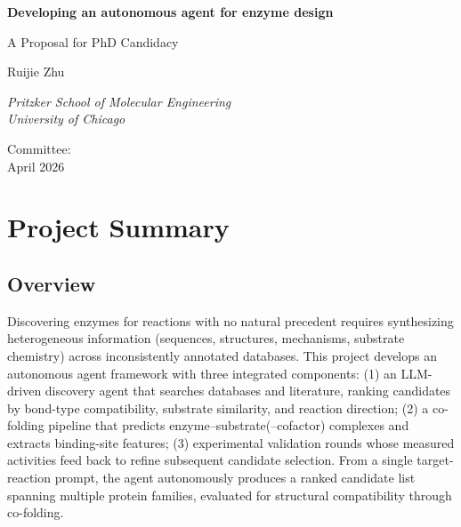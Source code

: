 \documentclass[12pt]{article}
\begin{document}
\begin{titlepage}
    \centering
    \vspace*{1in}

    \huge
    \textbf{Developing an autonomous agent for enzyme design}

    \vspace{0.5in}
    \LARGE
    A Proposal for PhD Candidacy

    \vspace{0.5in}
    \Huge
    Ruijie Zhu

    \Large
    \vspace{0.5in}
    \textit{Pritzker School of Molecular Engineering\\ University of Chicago}

    \vspace{1in}

    \Large
    Committee: \\

    \vfill
    April 2026
\end{titlepage}

\newpage
\setlength{\parindent}{0pt}
\setlength{\parskip}{1em}

\section*{Project Summary}

\subsection*{Overview}
Discovering enzymes for reactions with no natural precedent requires synthesizing heterogeneous information (sequences, structures, mechanisms, substrate chemistry) across inconsistently annotated databases. This project develops an autonomous agent framework with three integrated components: (1) an LLM-driven discovery agent that searches databases and literature, ranking candidates by bond-type compatibility, substrate similarity, and reaction direction; (2) a co-folding pipeline that predicts enzyme--substrate(--cofactor) complexes and extracts binding-site features; (3) experimental validation rounds whose measured activities feed back to refine subsequent candidate selection. From a single target-reaction prompt, the agent autonomously produces a ranked candidate list spanning multiple protein families, evaluated for structural compatibility through co-folding.
\end{document}
